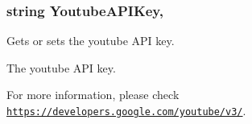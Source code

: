 \subsubsection[{Youtube\+A\+P\+I\+Key}]{\setlength{\rightskip}{0pt plus 5cm}string Youtube\+A\+P\+I\+Key\hspace{0.3cm}{\ttfamily [get]}, {\ttfamily [set]}}\label{class_voxel_busters_1_1_native_plugins_1_1_media_library_settings_1_1_android_settings_a67e2bce453bc7f62227e0ee2a7ff4cf0}


Gets or sets the youtube A\+P\+I key. 

The youtube A\+P\+I key.

For more information, please check \href{https://developers.google.com/youtube/v3/}{\tt https\+://developers.\+google.\+com/youtube/v3/}.  